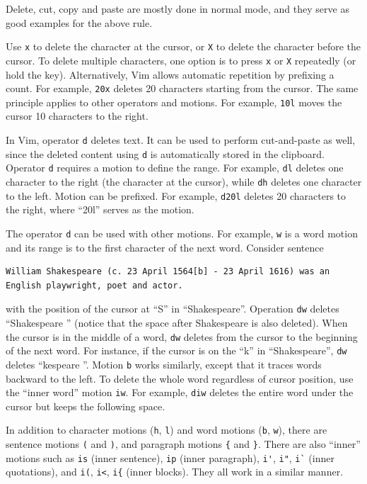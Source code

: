 Delete, cut, copy and paste are mostly done in normal mode, and they serve as good examples for the above rule.

Use \verb|x| to delete the character at the cursor, or \verb|X| to delete the character before the cursor. To delete multiple characters, one option is to press \verb|x| or \verb|X| repeatedly (or hold the key). Alternatively, Vim allows automatic repetition by prefixing a count. For example, \verb|20x| deletes 20 characters starting from the cursor. The same principle applies to other operators and motions. For example, \verb|10l| moves the cursor 10 characters to the right.

In Vim, operator \verb|d| deletes text. It can be used to perform cut-and-paste as well, since the deleted content using \verb|d| is automatically stored in the clipboard. Operator \verb|d| requires a motion to define the range. For example, \verb|dl| deletes one character to the right (the character at the cursor), while \verb|dh| deletes one character to the left. Motion can be prefixed. For example, \verb|d20l| deletes 20 characters to the right, where ``20l'' serves as the motion.

The operator \verb|d| can be used with other motions. For example, \verb|w| is a word motion and its range is to the first character of the next word. Consider sentence 
\begin{lstlisting}
William Shakespeare (c. 23 April 1564[b] - 23 April 1616) was an English playwright, poet and actor.
\end{lstlisting}
with the position of the cursor at ``S'' in ``Shakespeare''. Operation \verb|dw| deletes ``Shakespeare '' (notice that the space after Shakespeare is also deleted). When the cursor is in the middle of a word, \verb|dw| deletes from the cursor to the beginning of the next word. For instance, if the cursor is on the ``k'' in ``Shakespeare'', \verb|dw| deletes ``kespeare ''. Motion \verb|b| works similarly, except that it traces words backward to the left. To delete the whole word regardless of cursor position, use the ``inner word'' motion \verb|iw|. For example, \verb|diw| deletes the entire word under the cursor but keeps the following space.

In addition to character motions (\verb|h|, \verb|l|) and word motions (\verb|b|, \verb|w|), there are sentence motions \verb|(| and \verb|)|, and paragraph motions \verb|{| and \verb|}|. There are also ``inner'' motions such as \verb|is| (inner sentence), \verb|ip| (inner paragraph), \verb|i'|, \verb|i"|, \verb|i`| (inner quotations), and \verb|i(|, \verb|i<|, \verb|i{| (inner blocks). They all work in a similar manner.

